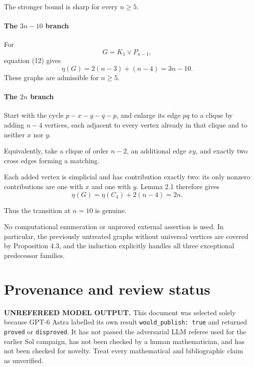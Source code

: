 \documentclass[
  11pt,
  a4paper,
]{article}
\begin{document}
The stronger bound is sharp for every \(n\ge5\).

\paragraph{\texorpdfstring{The \(3n-10\)
branch}{The 3n-10 branch}}\label{the-3n-10-branch}

For \[
G=K_1\vee P_{n-1},
\] equation (12) gives \[
\eta(G)=2(n-3)+(n-4)=3n-10.
\] These graphs are admissible for \(n\ge5\).

\paragraph{\texorpdfstring{The \(2n\)
branch}{The 2n branch}}\label{the-2n-branch}

Start with the cycle \(p-x-y-q-p\), and enlarge its edge \(pq\) to a
clique by adding \(n-4\) vertices, each adjacent to every vertex already
in that clique and to neither \(x\) nor \(y\).

Equivalently, take a clique of order \(n-2\), an additional edge \(xy\),
and exactly two cross edges forming a matching.

Each added vertex is simplicial and has contribution exactly two: its
only nonzero contributions are one with \(x\) and one with \(y\). Lemma
2.1 therefore gives \[
\eta(G)=\eta(C_4)+2(n-4)=2n.
\]

Thus the transition at \(n=10\) is genuine.

No computational enumeration or unproved external assertion is used. In
particular, the previously untreated graphs without universal vertices
are covered by Proposition 4.3, and the induction explicitly handles all
three exceptional predecessor families.

\appendix

\section{Provenance and review
status}\label{provenance-and-review-status}

\begin{warning}

\textbf{UNREFEREED MODEL OUTPUT.} This document was selected solely
because GPT-6 Astra labelled its own result
\texttt{would\_publish:\ true} and returned \texttt{proved} or
\texttt{disproved}. It has not passed the adversarial LLM referee used
for the earlier Sol campaign, has not been checked by a human
mathematician, and has not been checked for novelty. Treat every
mathematical and bibliographic claim as unverified.

\end{warning}
\end{document}

